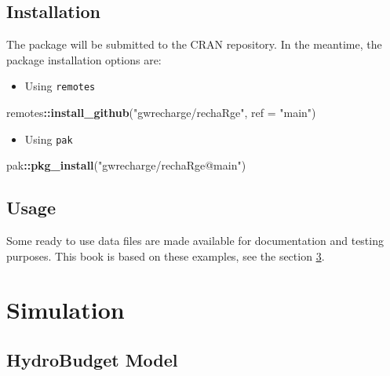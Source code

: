 \documentclass[
]{book}
\newenvironment{Shaded}{\begin{snugshade}}{\end{snugshade}}
\newcommand{\AttributeTok}[1]{\textcolor[rgb]{0.13,0.29,0.53}{#1}}
\newcommand{\FunctionTok}[1]{\textcolor[rgb]{0.13,0.29,0.53}{\textbf{#1}}}
\newcommand{\NormalTok}[1]{#1}
\newcommand{\SpecialCharTok}[1]{\textcolor[rgb]{0.81,0.36,0.00}{\textbf{#1}}}
\newcommand{\StringTok}[1]{\textcolor[rgb]{0.31,0.60,0.02}{#1}}
\providecommand{\tightlist}{%
  \setlength{\itemsep}{0pt}\setlength{\parskip}{0pt}}
\begin{document}
\hypertarget{installation}{%
\section{Installation}\label{installation}}

The package will be submitted to the CRAN repository. In the meantime, the package installation options are:

\begin{itemize}
\tightlist
\item
  Using \texttt{remotes}
\end{itemize}

\begin{Shaded}
\begin{Highlighting}[]
\NormalTok{remotes}\SpecialCharTok{::}\FunctionTok{install\_github}\NormalTok{(}\StringTok{"gwrecharge/rechaRge"}\NormalTok{, }\AttributeTok{ref =} \StringTok{"main"}\NormalTok{)}
\end{Highlighting}
\end{Shaded}

\begin{itemize}
\tightlist
\item
  Using \texttt{pak}
\end{itemize}

\begin{Shaded}
\begin{Highlighting}[]
\NormalTok{pak}\SpecialCharTok{::}\FunctionTok{pkg\_install}\NormalTok{(}\StringTok{"gwrecharge/rechaRge@main"}\NormalTok{)}
\end{Highlighting}
\end{Shaded}

\hypertarget{usage}{%
\section{Usage}\label{usage}}

Some ready to use data files are made available for documentation and testing purposes. This book is based on these examples, see the section \ref{simulation}.

\hypertarget{simulation}{%
\chapter{Simulation}\label{simulation}}

\hypertarget{hydrobudget-model}{%
\section{HydroBudget Model}\label{hydrobudget-model}}
\end{document}
